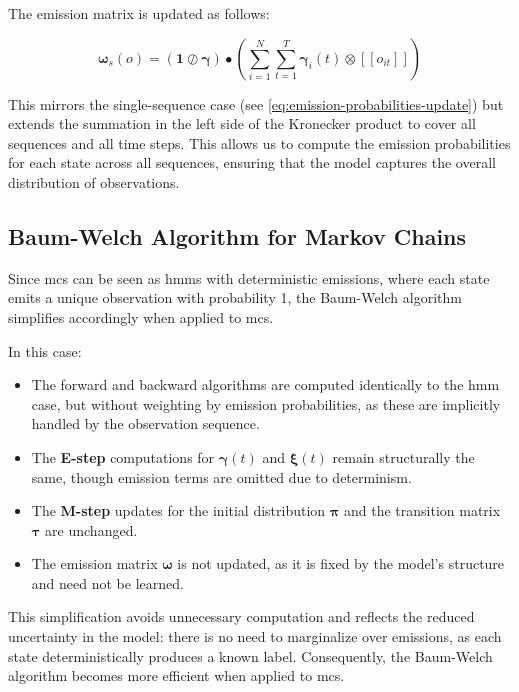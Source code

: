 The emission matrix is updated as follows:


\begin{equation}
    \pmb{\omega}
    _s(o) = (\mathbf{1} \oslash \pmb{\gamma}) \bullet \left( \sum_{i=1}^N \sum_{t=1}^{T} \pmb{\gamma}_i(t) \otimes [[o_{it}]] \right)
    \label{eq:omega-update}
\end{equation}


This mirrors the single-sequence case (see \autoref{eq:emission-probabilities-update}) but extends the summation in the left side of the Kronecker product to cover all sequences and all time steps.
This allows us to compute the emission probabilities for each state across all sequences, ensuring that the model captures the overall distribution of observations.

\subsection{Baum-Welch Algorithm for Markov Chains}\label{subsec:baum-welch-mc}
Since \glspl{mc} can be seen as \glspl{hmm} with deterministic emissions, where each state emits a unique observation with probability 1, the Baum-Welch algorithm simplifies accordingly when applied to \glspl{mc}.

In this case:

\begin{itemize}
    \item The forward and backward algorithms are computed identically to the \gls{hmm} case, but without weighting by emission probabilities, as these are implicitly handled by the observation sequence.
    \item The \textbf{E-step} computations for $\pmb{\gamma}(t)$ and $\pmb{\xi}(t)$ remain structurally the same, though emission terms are omitted due to determinism.
    \item The \textbf{M-step} updates for the initial distribution $\pmb{\pi}$ and the transition matrix $\pmb{\tau}$ are unchanged.
    \item The emission matrix $\pmb{\omega}$ is not updated, as it is fixed by the model's structure and need not be learned.
\end{itemize}

This simplification avoids unnecessary computation and reflects the reduced uncertainty in the model: there is no need to marginalize over emissions, as each state deterministically produces a known label.
Consequently, the Baum-Welch algorithm becomes more efficient when applied to \glspl{mc}.

